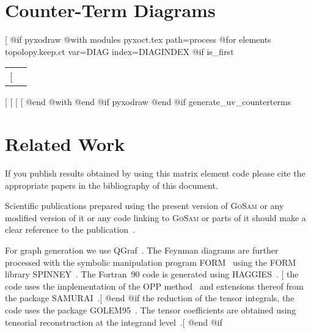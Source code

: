 {{{{{{{\section{Counter-Term Diagrams}
[%
@if pyxodraw %
@with modules pyxoct.tex path=process %
   @for elements topolopy.keep.ct var=DIAG index=DIAGINDEX %
     @if is_first %
\begin{longtable}{cc}
\endfirsthead
\endhead
[%
\hbox{
\begin{minipage}{0.45\textwidth}
\begin{center}
[%
{\sl Diagram~[%
\end{center}
\end{minipage}}
[%
\end{longtable}
[%
[%
[%
[%
   @end @with%
@end @if pyxodraw %
@end @if generate_uv_counterterms %
\printindex

\section{Related Work}
If you publish results obtained by using this matrix element code
please cite the appropriate papers in the bibliography of this document.

Scientific publications prepared using the present version of
\textsc{GoSam} or any modified version of it or any code linking to
\textsc{GoSam} or parts of it should make a clear
reference to the publication~\cite{Cullen:2011ac}.

For graph generation we use QGraf~\cite{Nogueira:1991ex}.
The Feynman diagrams are further processed with the symbolic manipulation
program FORM~\cite{Vermaseren:2000nd} using the FORM library
SPINNEY~\cite{Cullen:2010jv}.
The Fortran~90 code is generated using HAGGIES~\cite{Reiter:2009ts}.
[%
the code uses the implementation of the OPP
method~\cite{Ossola:2006us,Ossola:2007bb}
and extensions thereof from the package
SAMURAI~\cite{Mastrolia:2010nb}.[%
@end @if %
the reduction of the tensor integrals, the code uses the 
package GOLEM95~\cite{Binoth:2008uq,Cullen:2011kv}.
The tensor coefficients are
obtained using tensorial reconstruction at the integrand
level~\cite{Heinrich:2010ax}.[%
@end @if %

}}}}}}}
